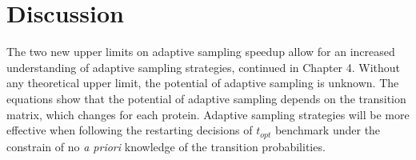 \section{\label{sec:methods}Discussion}

The two new upper limits on adaptive sampling speedup allow for an increased understanding of adaptive sampling strategies, continued in Chapter 4. Without any theoretical upper limit, the potential of adaptive sampling is unknown. The equations show that the potential of adaptive sampling depends on the transition matrix, which changes for each protein. Adaptive sampling strategies will be more effective when following the restarting decisions of $t_{opt}$ benchmark under the constrain of no \emph{a priori} knowledge of the transition probabilities.



















